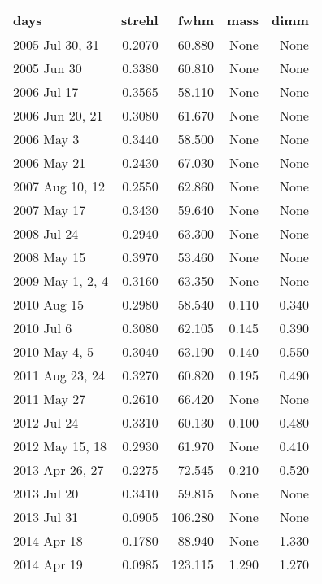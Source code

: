 \begin{tabular}{lrrrr}
\toprule
                  days &  strehl &     fwhm &   mass &   dimm \\
\midrule
       2005 Jul 30, 31 &  0.2070 &   60.880 &   None &   None \\
           2005 Jun 30 &  0.3380 &   60.810 &   None &   None \\
           2006 Jul 17 &  0.3565 &   58.110 &   None &   None \\
       2006 Jun 20, 21 &  0.3080 &   61.670 &   None &   None \\
            2006 May 3 &  0.3440 &   58.500 &   None &   None \\
           2006 May 21 &  0.2430 &   67.030 &   None &   None \\
       2007 Aug 10, 12 &  0.2550 &   62.860 &   None &   None \\
           2007 May 17 &  0.3430 &   59.640 &   None &   None \\
           2008 Jul 24 &  0.2940 &   63.300 &   None &   None \\
           2008 May 15 &  0.3970 &   53.460 &   None &   None \\
      2009 May 1, 2, 4 &  0.3160 &   63.350 &   None &   None \\
           2010 Aug 15 &  0.2980 &   58.540 &  0.110 &  0.340 \\
            2010 Jul 6 &  0.3080 &   62.105 &  0.145 &  0.390 \\
         2010 May 4, 5 &  0.3040 &   63.190 &  0.140 &  0.550 \\
       2011 Aug 23, 24 &  0.3270 &   60.820 &  0.195 &  0.490 \\
           2011 May 27 &  0.2610 &   66.420 &   None &   None \\
           2012 Jul 24 &  0.3310 &   60.130 &  0.100 &  0.480 \\
       2012 May 15, 18 &  0.2930 &   61.970 &   None &  0.410 \\
       2013 Apr 26, 27 &  0.2275 &   72.545 &  0.210 &  0.520 \\
           2013 Jul 20 &  0.3410 &   59.815 &   None &   None \\
           2013 Jul 31 &  0.0905 &  106.280 &   None &   None \\
           2014 Apr 18 &  0.1780 &   88.940 &   None &  1.330 \\
           2014 Apr 19 &  0.0985 &  123.115 &  1.290 &  1.270 \\

\end{tabular}
